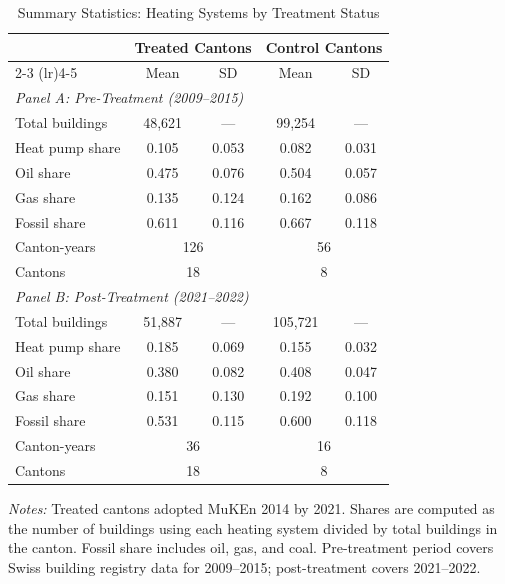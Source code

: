 \begin{table}[!htbp]
\centering
\caption{Summary Statistics: Heating Systems by Treatment Status}
\label{tab:summary}
\small
\begin{tabular}{lcccc}
\toprule
 & \multicolumn{2}{c}{Treated Cantons} & \multicolumn{2}{c}{Control Cantons} \\
\cmidrule(lr){2-3} \cmidrule(lr){4-5}
 & Mean & SD & Mean & SD \\
\midrule
\multicolumn{5}{l}{\textit{Panel A: Pre-Treatment (2009--2015)}} \\[3pt]
Total buildings & 48,621 & --- & 99,254 & --- \\
Heat pump share & 0.105 & 0.053 & 0.082 & 0.031 \\
Oil share & 0.475 & 0.076 & 0.504 & 0.057 \\
Gas share & 0.135 & 0.124 & 0.162 & 0.086 \\
Fossil share & 0.611 & 0.116 & 0.667 & 0.118 \\
Canton-years & \multicolumn{2}{c}{126} & \multicolumn{2}{c}{56} \\
Cantons & \multicolumn{2}{c}{18} & \multicolumn{2}{c}{8} \\
\midrule
\multicolumn{5}{l}{\textit{Panel B: Post-Treatment (2021--2022)}} \\[3pt]
Total buildings & 51,887 & --- & 105,721 & --- \\
Heat pump share & 0.185 & 0.069 & 0.155 & 0.032 \\
Oil share & 0.380 & 0.082 & 0.408 & 0.047 \\
Gas share & 0.151 & 0.130 & 0.192 & 0.100 \\
Fossil share & 0.531 & 0.115 & 0.600 & 0.118 \\
Canton-years & \multicolumn{2}{c}{36} & \multicolumn{2}{c}{16} \\
Cantons & \multicolumn{2}{c}{18} & \multicolumn{2}{c}{8} \\
\bottomrule
\end{tabular}
\begin{minipage}{0.92\textwidth}
\vspace{6pt}
\footnotesize
\textit{Notes:} Treated cantons adopted MuKEn 2014 by 2021. Shares are computed as the number of buildings using each heating system divided by total buildings in the canton. Fossil share includes oil, gas, and coal. Pre-treatment period covers Swiss building registry data for 2009--2015; post-treatment covers 2021--2022.
\end{minipage}
\end{table}
